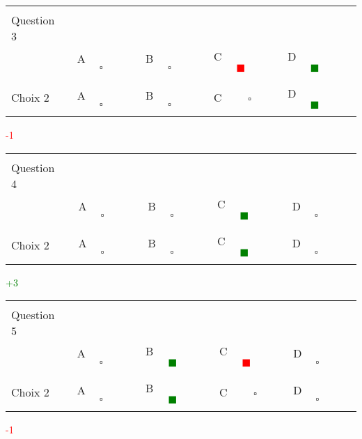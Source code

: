 \documentclass{book}%
\begin{document}
\begin{center}%
\begin{tabular}{| l  l  l  l  l |}%
\hline%
 & & & & \\%
Question 3\qquad \qquad\ & & & & \\%
& A $\qquad \square \qquad$& B $\qquad \square \qquad$& C \textcolor{red}{$\qquad \blacksquare \qquad$}& D \textcolor{green}{$\qquad \blacksquare \qquad$}\\%
 & & & & \\%
\hline%
 & & & &  \\%
Choix 2& A $\qquad \square \qquad$& B $\qquad \square \qquad$& C $\qquad \square \qquad$& D \textcolor{green}{$\qquad \blacksquare \qquad$}\\%
 & & & &  \\%
\hline%
\end{tabular}%
 \qquad  \textcolor{red}{-1}%
\\ \vskip3mm%
\end{center}%
\thispagestyle{empty}%
\begin{center}%
\begin{tabular}{| l  l  l  l  l |}%
\hline%
 & & & & \\%
Question 4\qquad \qquad\ & & & & \\%
& A $\qquad \square \qquad$& B $\qquad \square \qquad$& C \textcolor{green}{$\qquad \blacksquare \qquad$}& D $\qquad \square \qquad$\\%
 & & & & \\%
\hline%
 & & & &  \\%
Choix 2& A $\qquad \square \qquad$& B $\qquad \square \qquad$& C \textcolor{green}{$\qquad \blacksquare \qquad$}& D $\qquad \square \qquad$\\%
 & & & &  \\%
\hline%
\end{tabular}%
 \qquad  \textcolor{green}{+3}%
\\ \vskip3mm%
\end{center}%
\thispagestyle{empty}%
\begin{center}%
\begin{tabular}{| l  l  l  l  l |}%
\hline%
 & & & & \\%
Question 5\qquad \qquad\ & & & & \\%
& A $\qquad \square \qquad$& B \textcolor{green}{$\qquad \blacksquare \qquad$}& C \textcolor{red}{$\qquad \blacksquare \qquad$}& D $\qquad \square \qquad$\\%
 & & & & \\%
\hline%
 & & & &  \\%
Choix 2& A $\qquad \square \qquad$& B \textcolor{green}{$\qquad \blacksquare \qquad$}& C $\qquad \square \qquad$& D $\qquad \square \qquad$\\%
 & & & &  \\%
\hline%
\end{tabular}%
 \qquad  \textcolor{red}{-1}%
\\ \vskip3mm%
\end{center}%
\end{document}
